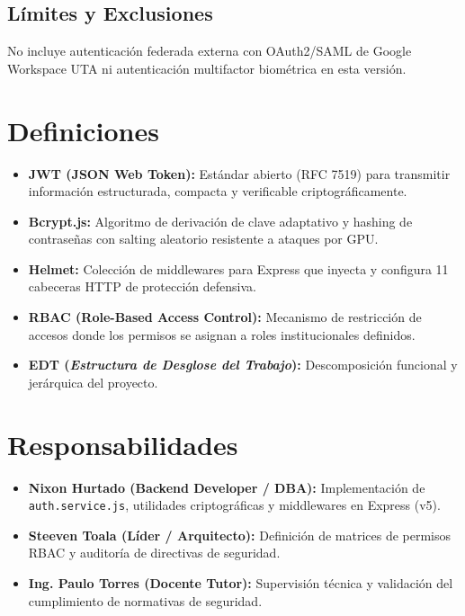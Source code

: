 \documentclass[12pt,a4paper]{article}
\begin{document}
\subsection{Límites y Exclusiones}
No incluye autenticación federada externa con OAuth2/SAML de Google Workspace UTA ni autenticación multifactor biométrica en esta versión.

\section{Definiciones}
\begin{itemize}[leftmargin=1.5em, itemsep=2pt, topsep=2pt]
    \item \textbf{JWT (JSON Web Token):} Estándar abierto (RFC 7519) para transmitir información estructurada, compacta y verificable criptográficamente.
    \item \textbf{Bcrypt.js:} Algoritmo de derivación de clave adaptativo y hashing de contraseñas con salting aleatorio resistente a ataques por GPU.
    \item \textbf{Helmet:} Colección de middlewares para Express que inyecta y configura 11 cabeceras HTTP de protección defensiva.
    \item \textbf{RBAC (Role-Based Access Control):} Mecanismo de restricción de accesos donde los permisos se asignan a roles institucionales definidos.
    \item \textbf{EDT (\textit{Estructura de Desglose del Trabajo}):} Descomposición funcional y jerárquica del proyecto.
\end{itemize}

\section{Responsabilidades}
\begin{itemize}[leftmargin=1.5em, itemsep=2pt, topsep=2pt]
    \item \textbf{Nixon Hurtado (Backend Developer / DBA):} Implementación de \texttt{auth.service.js}, utilidades criptográficas y middlewares en Express (v5).
    \item \textbf{Steeven Toala (Líder / Arquitecto):} Definición de matrices de permisos RBAC y auditoría de directivas de seguridad.
    \item \textbf{Ing. Paulo Torres (Docente Tutor):} Supervisión técnica y validación del cumplimiento de normativas de seguridad.
\end{itemize}
\end{document}
